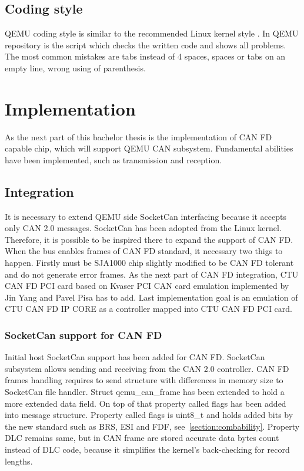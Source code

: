 \documentclass{ctuthesis}
\begin{document}
 \section{Coding style}
  QEMU coding style \cite{qemu-style} is similar to the recommended Linux kernel style \cite{linux-style}. In QEMU repository is the script which checks the written code and shows all problems. The most common mistakes are tabs instead of 4 spaces, spaces or tabs on an empty line, wrong using of parenthesis.
 
\chapter{Implementation}
 As the next part of this bachelor thesis is the implementation of CAN FD capable chip, which will support QEMU CAN subsystem. Fundamental abilities have been implemented, such as transmission and reception. 
 \section{Integration}
  It is necessary to extend QEMU side SocketCan interfacing because it accepts only CAN 2.0 messages. SocketCan has been adopted from the Linux kernel. Therefore, it is possible to be inspired there to expand the support of CAN FD. When the bus enables frames of CAN FD standard, it necessary two thigs to happen. Firstly must be SJA1000 chip slightly modified to be CAN FD tolerant and do not generate error frames. As the next part of CAN FD integration, CTU CAN FD PCI card based on Kvaser PCI CAN card emulation implemented by Jin Yang and Pavel Pisa has to add. Last implementation goal is an emulation of CTU CAN FD IP CORE as a controller mapped into CTU CAN FD PCI card.
 \subsection{SocketCan support for CAN FD}
  Initial host SocketCan support has been added for CAN FD. SocketCan subsystem allows sending and receiving from the CAN 2.0 controller. CAN FD frames handling requires to send structure with differences in memory size to SocketCan file handler. Struct qemu\_can\_frame has been extended to hold a more extended data field. On top of that property called flags has been added into message structure. Property called flags is uint8\_t and holds added bits by the new standard such as BRS, ESI and FDF, see~\ref{section:combability}. Property DLC remains same, but in CAN frame are stored accurate data bytes count instead of DLC code, because it simplifies the kernel's back-checking for record lengths.
\end{document}

